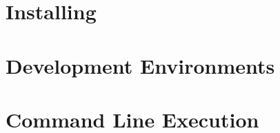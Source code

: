 \documentclass[letterpaper]{article}
\begin{document}
    \newpage{}

    \appendix{}

    \section{Installing \LaTeXe}
    \label{Installing}


    \section{Development Environments}
    \label{Development Environments}


    \section{Command Line Execution}
    \label{Command Line}

    \theendnotes{}
\end{document}
